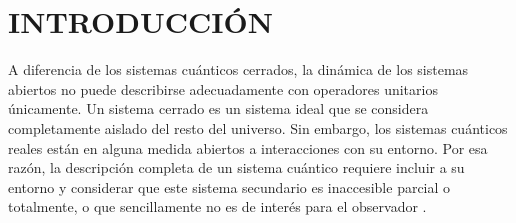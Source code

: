 \chapter{INTRODUCCIÓN}

A diferencia de los sistemas cuánticos cerrados, la dinámica 
de los sistemas abiertos no puede describirse adecuadamente 
con operadores unitarios únicamente.
Un sistema cerrado es un sistema ideal que se considera completamente
aislado del resto del universo. Sin embargo, los sistemas cuánticos 
reales están en alguna medida abiertos a interacciones con su entorno.
Por esa razón, la descripción completa de un sistema cuántico requiere
incluir a su entorno y considerar que este sistema secundario
es inaccesible parcial o totalmente, o que sencillamente no es de interés 
para el observador \cite{schlosshauer2007decoherence}.



